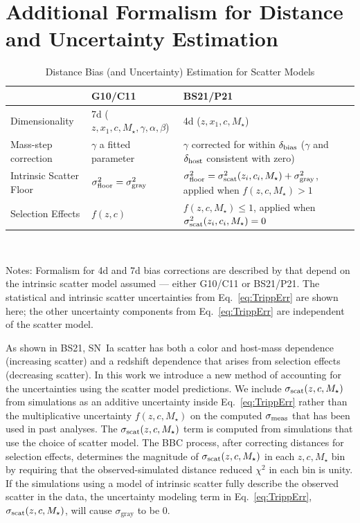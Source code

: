 \documentclass[twocolumn]{aastex63}
\begin{document}
\appendix
\section{Additional Formalism for Distance and Uncertainty Estimation}
\label{appendix:biascor}

\begin{table}
   
    \caption{Distance Bias (and Uncertainty) Estimation for Scatter Models}
    \begin{tabular}{lll}
        \toprule
		 & G10/C11 & BS21/P21  \\ 
		\hline
	Dimensionality & 7d ($z,x_1,c,M_{\star},\gamma,\alpha,\beta$)& 4d ($z,x_1,c,M_{\star}$)\\	
	Mass-step correction & $\gamma$ a fitted parameter & $\gamma$ corrected for within $\delta_{\rm bias}$ ($\gamma$ and $\delta_{\rm host}$ consistent with zero) \\
	Intrinsic Scatter Floor & $\sigma_{\rm floor}^2=\sigma_{\rm gray}^2$ & $\sigma_{\rm floor}^2=\sigma^2_{\rm scat}(z_i,c_i,M_{\star})+\sigma^2_{\rm gray}$, applied when $f(z,c,M_\star)>1$ \\
	Selection Effects & $f(z,c)$  &  $f(z,c,M_\star)\leq1$, applied when $\sigma^2_{\rm scat}(z_i,c_i,M_{\star})=0$   \\
    \hline

	\end{tabular}	\vspace{3mm}
	~\\
	\raggedright Notes: Formalism for 4d and 7d bias corrections are described by \cite{popovic21a} that depend on the intrinsic scatter model assumed --- either G10/C11 or BS21/P21.  The statistical and intrinsic scatter uncertainties from Eq.~\ref{eq:TrippErr} are shown here; the other uncertainty components from Eq.~\ref{eq:TrippErr} are independent of the scatter model.
	\label{tab:biassum}
	\end{table}






As shown in BS21, SN~Ia scatter has both a color and host-mass dependence (increasing scatter) and a redshift dependence that arises from selection effects (decreasing scatter). In this work we introduce a new method of accounting for the uncertainties using the scatter model predictions.
We include $\sigma_{\rm scat}(z,c,M_\star)$ from simulations as an additive uncertainty inside Eq.~\ref{eq:TrippErr} rather than the multiplicative uncertainty $f(z,c,M_\star)$ on the computed $\sigma_{\rm meas}$ that has been used in past analyses. 
{The $\sigma_{\rm scat}(z,c,M_\star)$ term is computed from simulations that use the choice of scatter model.} The BBC process, after correcting distances for selection effects, determines the magnitude of $\sigma_{\rm scat}(z,c,M_\star)$ in each $z,c,M_\star$ bin by requiring that the observed-simulated distance reduced $\chi^2$ in each bin is unity. If the simulations {using a model of intrinsic scatter fully describe the observed scatter in the data, the uncertainty modeling term in Eq.~\ref{eq:TrippErr}, $\sigma_{\rm scat}(z,c,M_\star)$,} will cause $\sigma_{\textrm{gray}}$ to be 0.
\end{document}
